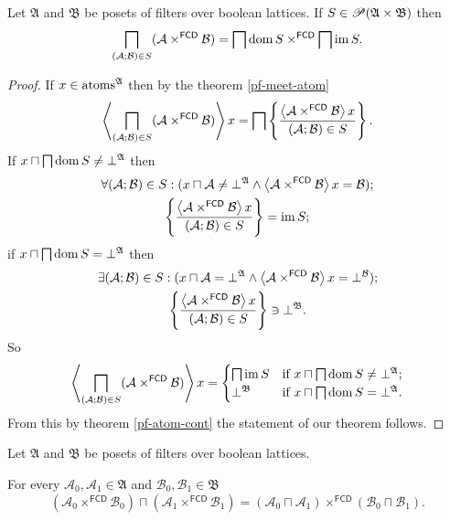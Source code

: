 \begin{thm}
Let $\mathfrak{A}$ and $\mathfrak{B}$ be posets of filters over
boolean lattices. If $S\in\mathscr{P}(\mathfrak{A}\times\mathfrak{B})$
then
\[
\bigsqcap_{(\mathcal{A};\mathcal{B})\in S}(\mathcal{A}\times^{\mathsf{FCD}}\mathcal{B})=\bigsqcap\operatorname{dom} S\times^{\mathsf{FCD}}\bigsqcap\operatorname{im} S.
\]
\end{thm}
\begin{proof}
If $x\in\operatorname{atoms}^{\mathfrak{A}}$ then by the theorem \ref{pf-meet-atom}
\[
\left\langle \bigsqcap_{(\mathcal{A};\mathcal{B})\in S}(\mathcal{A}\times^{\mathsf{FCD}}\mathcal{B})\right\rangle x=\bigsqcap\left\{ \frac{\left\langle \mathcal{A}\times^{\mathsf{FCD}}\mathcal{B}\right\rangle x}{(\mathcal{A};\mathcal{B})\in S}\right\}.
\]
If $x\sqcap\bigsqcap\operatorname{dom} S\ne\bot^{\mathfrak{A}}$ then
\begin{gather*}
\forall(\mathcal{A};\mathcal{B})\in S:(x\sqcap\mathcal{A}\ne\bot^{\mathfrak{A}}\land\left\langle \mathcal{A}\times^{\mathsf{FCD}}\mathcal{B}\right\rangle x=\mathcal{B});\\
\left\{ \frac{\left\langle \mathcal{A}\times^{\mathsf{FCD}}\mathcal{B}\right\rangle x}{(\mathcal{A};\mathcal{B})\in S}\right\}=\operatorname{im} S;
\end{gather*}
if $x\sqcap\bigsqcap\operatorname{dom} S=\bot^{\mathfrak{A}}$ then
\begin{gather*}
\exists(\mathcal{A};\mathcal{B})\in S:(x\sqcap\mathcal{A}=\bot^{\mathfrak{A}}\land\left\langle \mathcal{A}\times^{\mathsf{FCD}}\mathcal{B}\right\rangle x=\bot^{\mathcal{B}});\\
\left\{ \frac{\left\langle \mathcal{A}\times^{\mathsf{FCD}}\mathcal{B}\right\rangle x}{(\mathcal{A};\mathcal{B})\in S}\right\}\ni\bot^{\mathfrak{B}}.
\end{gather*}
So
\[
\left\langle \bigsqcap_{(\mathcal{A};\mathcal{B})\in S}(\mathcal{A}\times^{\mathsf{FCD}}\mathcal{B})\right\rangle x=\begin{cases}
\bigsqcap\operatorname{im} S & \text{if }x\sqcap\bigsqcap\operatorname{dom} S\ne\bot^{\mathfrak{A}};\\
\bot^{\mathfrak{B}} & \text{if }x\sqcap\bigsqcap\operatorname{dom} S=\bot^{\mathfrak{A}}.
\end{cases}
\]
From this by theorem \ref{pf-atom-cont} the statement of our theorem
follows.\end{proof}
\begin{cor}
Let $\mathfrak{A}$ and $\mathfrak{B}$ be posets of filters over
boolean lattices.

For every $\mathcal{A}_{0},\mathcal{A}_{1}\in\mathfrak{A}$ and $\mathcal{B}_{0},\mathcal{B}_{1}\in\mathfrak{B}$
\[
(\mathcal{A}_{0}\times^{\mathsf{FCD}}\mathcal{B}_{0})\sqcap(\mathcal{A}_{1}\times^{\mathsf{FCD}}\mathcal{B}_{1})=(\mathcal{A}_{0}\sqcap\mathcal{A}_{1})\times^{\mathsf{FCD}}(\mathcal{B}_{0}\sqcap\mathcal{B}_{1}).
\]
\end{cor}
